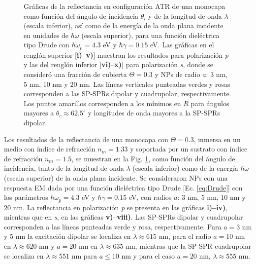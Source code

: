 \begin{figure}[h!]
\vspace*{-.5em}
	\caption{Gráficas de la reflectancia en configuración ATR de una monocapa como función del ángulo de incidencia $\theta_i$ y de la longitud de onda $\lambda$ (escala inferior), así como de la energía de la onda plana incidente en unidades de $\hbar\omega$ (escala superior), para una función dieléctrica tipo Drude con $\hbar\omega_p=4.3$ eV  y  $\hbar\gamma=0. 15$ eV.  Las gráficas   en el renglón superior [\textbf{i)--v)}] muestran los resultados para  polarización \emph{p} y las del renglón inferior  [\textbf{vi)}--\textbf{x)}]  para polarización  \emph{s}, donde se consideró una fracción de cubierta $\Theta = 0.3$ y  NPs de radio  $a$: $3$ nm, $5$ nm, $10$ nm y $20$ nm.  Las líneas verticales punteadas verdes y rosas corresponden a las SP-SPRs dipolar y  cuadrupolar, respectivamente.  Los puntos amarillos corresponden a los mínimos en $R$ para ángulos mayores a $\theta_c\approx 62.5^\circ$ y longitudes de onda mayores a la SP-SPRs dipolar.
}	\label{fig:R-RVar}	
	\end{figure}	

Los resultados de la reflectancia de una monocapa con $\Theta=0.3$, inmersa en un medio con índice de refracción $n_m = 1.33$ y soportada por un sustrato con índice de refracción $n_m= 1.5$, se muestran en la Fig.  \ref{fig:R-RVar}, como función del ángulo de incidencia, tanto de la longitud de onda $\lambda$ (escala inferior) como de la  energía $\hbar\omega$ (escala superior) de la onda plana incidente. Se consideraron NPs  con una respuesta EM dada por una función dieléctrica  tipo Drude [Ec. \eqref{eq:Drude}] con los parámetros $\hbar\omega_p =4.3$ eV y $\hbar\gamma=0.15$ eV, con radios $a$: $3$ nm, $5$ nm, $10$ nm y $20$ nm. La reflectancia en polarización \emph{p} se presenta en las gráficas \textbf{i)--iv)}, mientras que en \emph{s}, en las gráficas \textbf{v)--viii)}. Las SP-SPRs dipolar y cuadrupolar corresponden a las líneas punteadas verde y rosa, respectivamente. Para $a = 3$ nm y $5$ nm la excitación dipolar se localiza en $\lambda\approx 615$ nm, para el radio  $a = 10$ nm en $\lambda\approx 620$ nm y $a=20$ nm en $\lambda\approx 635$ nm, mientras que la SP-SPR cuadrupolar se localiza en $\lambda\approx 551$ nm para $a\leq 10$ nm y para el caso  $a=20$ nm, $\lambda \approx 555$ nm.	
	
